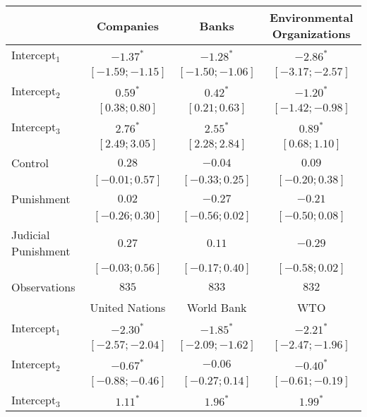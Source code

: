 \begin{table}[h]
\begin{center}
\begin{threeparttable}
\begin{tabular}{l c c c}
\hline
 & Companies & Banks & Environmental
Organizations \\
\hline
Intercept$_1$       & $-1.37^{*}$       & $-1.28^{*}$       & $-2.86^{*}$       \\
                    & $ [-1.59; -1.15]$ & $ [-1.50; -1.06]$ & $ [-3.17; -2.57]$ \\
Intercept$_2$       & $0.59^{*}$        & $0.42^{*}$        & $-1.20^{*}$       \\
                    & $ [ 0.38;  0.80]$ & $ [ 0.21;  0.63]$ & $ [-1.42; -0.98]$ \\
Intercept$_3$       & $2.76^{*}$        & $2.55^{*}$        & $0.89^{*}$        \\
                    & $ [ 2.49;  3.05]$ & $ [ 2.28;  2.84]$ & $ [ 0.68;  1.10]$ \\
Control             & $0.28$            & $-0.04$           & $0.09$            \\
                    & $ [-0.01;  0.57]$ & $ [-0.33;  0.25]$ & $ [-0.20;  0.38]$ \\
Punishment          & $0.02$            & $-0.27$           & $-0.21$           \\
                    & $ [-0.26;  0.30]$ & $ [-0.56;  0.02]$ & $ [-0.50;  0.08]$ \\
Judicial Punishment & $0.27$            & $0.11$            & $-0.29$           \\
                    & $ [-0.03;  0.56]$ & $ [-0.17;  0.40]$ & $ [-0.58;  0.02]$ \\
\hline
Observations        & $835$             & $833$             & $832$             \\
\hline
 & United Nations & World Bank & WTO \\
\hline
Intercept$_1$       & $-2.30^{*}$       & $-1.85^{*}$       & $-2.21^{*}$       \\
                    & $ [-2.57; -2.04]$ & $ [-2.09; -1.62]$ & $ [-2.47; -1.96]$ \\
Intercept$_2$       & $-0.67^{*}$       & $-0.06$           & $-0.40^{*}$       \\
                    & $ [-0.88; -0.46]$ & $ [-0.27;  0.14]$ & $ [-0.61; -0.19]$ \\
Intercept$_3$       & $1.11^{*}$        & $1.96^{*}$        & $1.99^{*}$        \\

\end{tabular}
\end{threeparttable}
\end{center}
\end{table}
